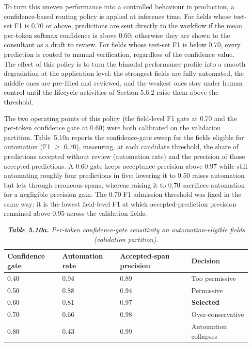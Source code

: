 To turn this uneven performance into a controlled behaviour in production, a confidence-based routing policy is applied at inference time. For fields whose test-set F1 is 0.70 or above, predictions are sent directly to the workflow if the mean per-token softmax confidence is above 0.60; otherwise they are shown to the consultant as a draft to review. For fields whose test-set F1 is below 0.70, every prediction is routed to manual verification, regardless of the confidence value. The effect of this policy is to turn the bimodal performance profile into a smooth degradation at the application level: the strongest fields are fully automated, the middle ones are pre-filled and reviewed, and the weakest ones stay under human control until the lifecycle activities of Section 5.6.2 raise them above the threshold.

The two operating points of this policy (the field-level F1 gate at 0.70 and the per-token confidence gate at 0.60) were both calibrated on the validation partition. Table~5.10a reports the confidence-gate sweep for the fields eligible for automation (F1 $\geq$ 0.70), measuring, at each candidate threshold, the share of predictions accepted without review (automation rate) and the precision of those accepted predictions. A 0.60 gate keeps acceptance precision above 0.97 while still automating roughly four predictions in five; lowering it to 0.50 raises automation but lets through erroneous spans, whereas raising it to 0.70 sacrifices automation for a negligible precision gain. The 0.70 F1 admission threshold was fixed in the same way: it is the lowest field-level F1 at which accepted-prediction precision remained above 0.95 across the validation fields.

\begin{table}[H]
  \centering
  \caption{\textit{\textbf{Table 5.10a.} Per-token confidence-gate sensitivity on automation-eligible fields (validation partition).}}
  \renewcommand{\arraystretch}{1.0}
  \footnotesize
  \begin{tabularx}{\textwidth}{|X|X|X|X|}
    \hline
    \textbf{Confidence gate} & \textbf{Automation rate} & \textbf{Accepted-span precision} & \textbf{Decision} \\ \hline
    0.40 & 0.94 & 0.89 & Too permissive \\ \hline
    0.50 & 0.88 & 0.94 & Permissive \\ \hline
    0.60 & 0.81 & 0.97 & \textbf{Selected} \\ \hline
    0.70 & 0.66 & 0.98 & Over-conservative \\ \hline
    0.80 & 0.43 & 0.99 & Automation collapses \\ \hline
  \end{tabularx}
\end{table}

